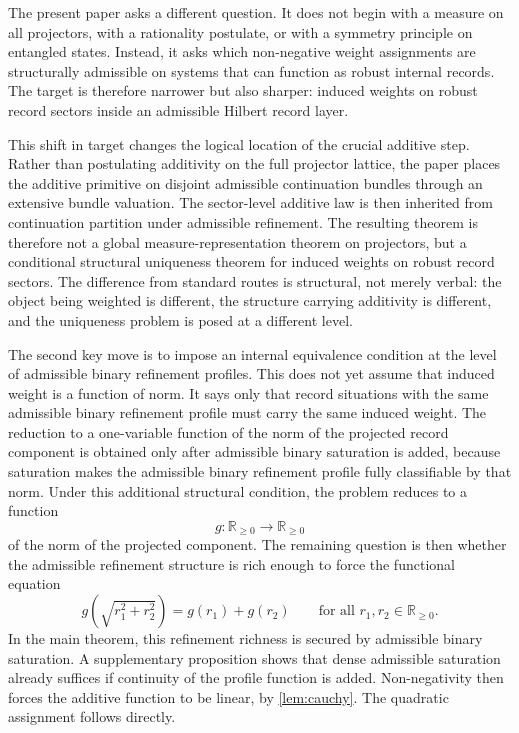 \documentclass[11pt]{article}
\theoremstyle{remark}
\numberwithin{equation}{section}
\newcommand{\RR}{\mathbb{R}}
\begin{document}
The present paper asks a different question. It does not begin with a measure on all projectors, with a rationality postulate, or with a symmetry principle on entangled states. Instead, it asks which non-negative weight assignments are structurally admissible on systems that can function as robust internal records. The target is therefore narrower but also sharper: induced weights on robust record sectors inside an admissible Hilbert record layer.

This shift in target changes the logical location of the crucial additive step. Rather than postulating additivity on the full projector lattice, the paper places the additive primitive on disjoint admissible continuation bundles through an extensive bundle valuation. The sector-level additive law is then inherited from continuation partition under admissible refinement. The resulting theorem is therefore not a global measure-representation theorem on projectors, but a conditional structural uniqueness theorem for induced weights on robust record sectors. The difference from standard routes is structural, not merely verbal: the object being weighted is different, the structure carrying additivity is different, and the uniqueness problem is posed at a different level.

The second key move is to impose an internal equivalence condition at the level of admissible binary refinement profiles. This does not yet assume that induced weight is a function of norm. It says only that record situations with the same admissible binary refinement profile must carry the same induced weight. The reduction to a one-variable function of the norm of the projected record component is obtained only after admissible binary saturation is added, because saturation makes the admissible binary refinement profile fully classifiable by that norm. Under this additional structural condition, the problem reduces to a function
\[
g : \RR_{\geq 0} \to \RR_{\geq 0}
\]
of the norm of the projected component. The remaining question is then whether the admissible refinement structure is rich enough to force the functional equation
\[
g\!\left(\sqrt{r_1^2+r_2^2}\right) = g(r_1) + g(r_2)
\qquad
\text{for all } r_1,r_2 \in \RR_{\geq 0}.
\]
In the main theorem, this refinement richness is secured by admissible binary saturation. A supplementary proposition shows that dense admissible saturation already suffices if continuity of the profile function is added. Non-negativity then forces the additive function to be linear, by \cref{lem:cauchy}. The quadratic assignment follows directly.
\end{document}
